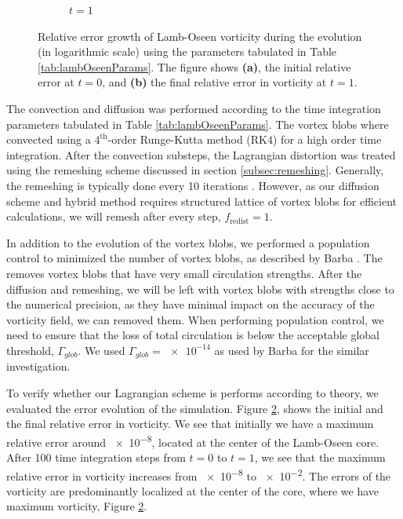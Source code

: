 \begin{figure}[!t]
\begin{subfigure}[b]{0.45\textwidth}
	          \caption{$t=1$}
	          \label{fig:lambOseen_convection_vorticityErrorContours_final}
	  \end{subfigure}
	  
	  \caption{Relative error growth of Lamb-Oseen vorticity during the evolution (in logarithmic scale) using the parameters tabulated in Table \ref{tab:lambOseenParams}. The figure shows \textbf{(a)}, the initial relative error at $t=0$, and \textbf{(b)} the final relative error in vorticity at $t=1$.}
	  \label{fig:lambOseen_convection_vorticityErrorContours}
		\end{figure}


The convection and diffusion was performed according to the time integration parameters tabulated in Table \ref{tab:lambOseenParams}. The vortex blobs where convected using a $4^{\mathrm{th}}$-order Runge-Kutta method ($\mathrm{RK4}$) for a high order time integration. After the convection substeps, the Lagrangian distortion was treated using the remeshing scheme discussed in section \ref{subsec:remeshing}. Generally, the remeshing is typically done every 10 iterations \cite{Barba2004c}. However, as our diffusion scheme and hybrid method requires structured lattice of vortex blobs for efficient calculations, we will remesh after every step, $f_{\mathrm{redist}}=1$.  


In addition to the evolution of the vortex blobs, we performed a population control to minimized the number of vortex blobs, as described by Barba \cite{Barba2004c}. The  removes vortex blobs that have very small circulation strengths. After the diffusion and remeshing, we will be left with vortex blobs with strengths close to the numerical precision, as they have minimal impact on the accuracy of the vorticity field, we can removed them. When performing population control, we need to ensure that the loss of total circulation is below the acceptable global threshold, $\Gamma_{glob}$. We used $\Gamma_{glob}=\num{e-14}$ as used by Barba \cite{Barba2004c} for the similar investigation. 

To verify whether our Lagrangian scheme is performs according to theory, we evaluated the error evolution of the simulation. Figure \ref{fig:lambOseen_convection_vorticityErrorContours}, shows the initial and the final relative error in vorticity. We see that initially we have a maximum relative error around \num{e-8}, located at the center of the Lamb-Oseen core. After 100 time integration steps from $t=0$ to $t=1$, we see that the maximum relative error in vorticity increases from \num{e-8} to \num{e-2}. The errors of the vorticity are predominantly localized at the center of the core, where we have maximum vorticity, Figure \ref{fig:lambOseen_convection_vorticityErrorContours}.




